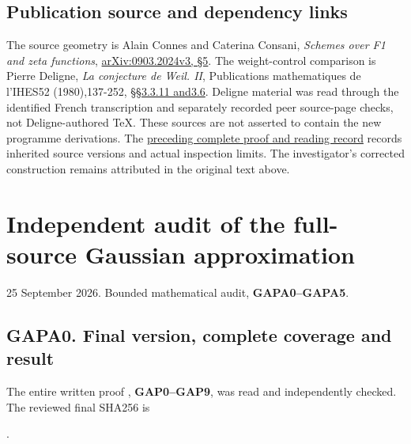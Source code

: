 \section{Publication source and dependency
links}\label{publication-source-and-dependency-links-2}

The source geometry is Alain Connes and Caterina Consani, \emph{Schemes
over F1 and zeta functions},
\href{https://arxiv.org/abs/0903.2024v3}{arXiv:0903.2024v3, §5}. The
weight-control comparison is Pierre Deligne, \emph{La conjecture de
Weil. II}, Publications mathematiques de l'IHES52 (1980),137-252,
\href{https://www.numdam.org/item/PMIHES_1980__52__137_0/}{§§3.3.11
and3.6}. Deligne material was read through the identified French
transcription and separately recorded peer source-page checks, not
Deligne-authored TeX. These sources are not asserted to contain the new
programme derivations. The
\href{https://github.com/KokunoYumeto/zeta-function-research-reader/blob/36a82ecca98addb8a98b48204e349737856c7223/workbenches/splitzero-tandem/continuations/20260924-cohomology-weight-and-character-lifts/BUILD_AND_REVIEW.md}{preceding
complete proof and reading record} records inherited source versions and
actual inspection limits. The investigator's corrected construction
remains attributed in the original text above.

\chapter{Independent audit of the full-source Gaussian
approximation}\label{independent-audit-of-the-full-source-gaussian-approximation}

25 September 2026. Bounded mathematical audit, \textbf{GAPA0--GAPA5}.

\section{GAPA0. Final version, complete coverage and
result}\label{gapa0.-final-version-complete-coverage-and-result}

The entire written proof
\href{https://github.com/KokunoYumeto/zeta-function-research-reader/blob/main/workbenches/splitzero-tandem/continuations/20260925-full-source-tensor-and-original-divisor/identity/GAUSSIAN_FULL_SOURCE_APPROXIMATION.md}{},
\textbf{GAP0--GAP9}, was read and independently checked. The reviewed
final SHA256 is

.

